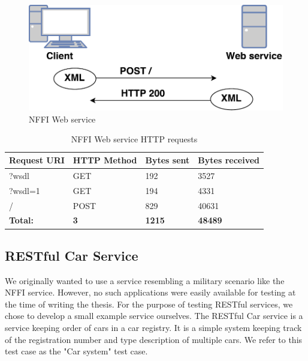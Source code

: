 \begin{figure}[h]
\centering
\includegraphics[scale=0.6]{images/nffi_flow.pdf}
\caption{NFFI Web service}
\label{figure-nffi-flow}
\end{figure}

\begin{table}[h]
\begin{tabular}{|l|l|l|l|}
\hline
\textbf{Request URI} & \textbf{HTTP Method} & \textbf{Bytes sent} & \textbf{Bytes received} \\ \hline
?wsdl                & GET                  & 192                 & 3527           \\ \hline
?wsdl=1              & GET                  & 194                 & 4331           \\ \hline
/                    & POST                 & 829                 & 40631          \\ \hline
\textbf{Total:}       & \textbf{3}                     & \textbf{1215}                & \textbf{48489}          \\ \hline
\end{tabular}
\caption{NFFI Web service HTTP requests}
\end{table}


\subsection{RESTful Car Service}

We originally wanted to use a service resembling a military scenario like the
NFFI service. However, no such applications were easily available for testing at
the time of writing the thesis. For the purpose of testing RESTful services, we
chose to develop a small example service ourselves. The RESTful Car service is a
service keeping order of cars in a car registry. It is a simple system keeping
track of the registration number and type description of multiple cars. We refer
to this test case as the "Car system" test case.

